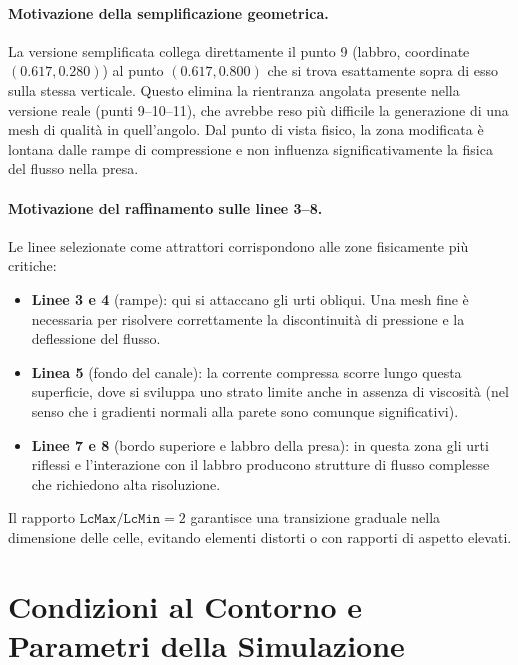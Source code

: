 \paragraph{Motivazione della semplificazione geometrica.}
La versione semplificata collega direttamente il punto 9 (labbro, coordinate $(0.617, 0.280)$)
al punto $(0.617, 0.800)$ che si trova esattamente sopra di esso sulla stessa verticale.
Questo elimina la rientranza angolata presente nella versione reale (punti 9--10--11), che
avrebbe reso più difficile la generazione di una mesh di qualità in quell'angolo. Dal punto di
vista fisico, la zona modificata è lontana dalle rampe di compressione e non influenza
significativamente la fisica del flusso nella presa.

\paragraph{Motivazione del raffinamento sulle linee 3--8.}
Le linee selezionate come attrattori corrispondono alle zone fisicamente più critiche:
\begin{itemize}
  \item \textbf{Linee 3 e 4} (rampe): qui si attaccano gli urti obliqui. Una mesh fine è
    necessaria per risolvere correttamente la discontinuità di pressione e la deflessione del
    flusso.
  \item \textbf{Linea 5} (fondo del canale): la corrente compressa scorre lungo questa superficie,
    dove si sviluppa uno strato limite anche in assenza di viscosità (nel senso che i gradienti
    normali alla parete sono comunque significativi).
  \item \textbf{Linee 7 e 8} (bordo superiore e labbro della presa): in questa zona gli urti
    riflessi e l'interazione con il labbro producono strutture di flusso complesse che richiedono
    alta risoluzione.
\end{itemize}

Il rapporto $\texttt{LcMax}/\texttt{LcMin} = 2$ garantisce una transizione graduale nella
dimensione delle celle, evitando elementi distorti o con rapporti di aspetto elevati.

\section{Condizioni al Contorno e Parametri della Simulazione}
\label{sec:presa_bc}


